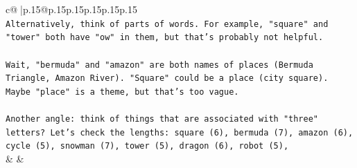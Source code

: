 \documentclass{article}
\begin{document}
{\begin{supertabular}{c@{$\;$}|p{.15\linewidth}@{}p{.15\linewidth}p{.15\linewidth}p{.15\linewidth}p{.15\linewidth}p{.15\linewidth}}
{{{\\ 
\texttt{Alternatively, think of parts of words. For example, "square" and "tower" both have "ow" in them, but that's probably not helpful. } \\
\\ 
\texttt{Wait, "bermuda" and "amazon" are both names of places (Bermuda Triangle, Amazon River). "Square" could be a place (city square). Maybe "place" is a theme, but that's too vague. } \\
\\ 
\texttt{Another angle: think of things that are associated with "three" letters? Let's check the lengths: square (6), bermuda (7), amazon (6), cycle (5), snowman (7), tower (5), dragon (6), robot (5),} \\
            }
        }
    }
    & & \\ \\


\end{supertabular}}
\end{document}
